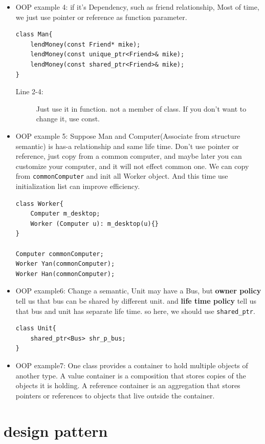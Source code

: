 \documentclass[a4paper,11pt,twoside]{book}
\begin{document}
\begin{itemize}
	\item OOP example 4: if it's Dependency,  such as friend relationship,  Most of time, we just use pointer or reference as function parameter.
\begin{lstlisting}[numbers=none]
class Man{
	lendMoney(const Friend* mike);
    lendMoney(const unique_ptr<Friend>& mike);
    lendMoney(const shared_ptr<Friend>& mike);
}
\end{lstlisting}
\begin{description}
	\item[Line 2-4:] Just use it in function. not a member of class. If you don't want to change it, use const.
\end{description}
	
	\item OOP example 5: Suppose Man and Computer(Associate from structure semantic) is has-a relationship and same life time. Don't use pointer or reference, just copy from a common computer, and maybe later you can customize your computer, and it will not effect common one.  We can copy from \texttt{commonComputer} and init all Worker object.  And this time use initialization list can improve efficiency.
\begin{lstlisting}[numbers=none]
class Worker{
	Computer m_desktop;
	Worker (Computer u): m_desktop(u){}
}
	
Computer commonComputer;
Worker Yan(commonComputer);
Worker Han(commonComputer);
\end{lstlisting}
	
	
	\item OOP example6:  Change a semantic,  Unit may have a Bus, but \textbf{owner policy} tell us that bus can be shared by different unit. and \textbf{life time policy} tell us that bus and unit has separate life time. so here, we should use \texttt{shared\_ptr}.
\begin{lstlisting}[numbers=none]
class Unit{
	shared_ptr<Bus> shr_p_bus;
}
\end{lstlisting}
	
	\item OOP example7: One class provides a container to hold multiple objects of another type. A value container is a composition that stores copies of the objects it is holding. A reference container is an aggregation that stores pointers or references to objects that live outside the container.
	
\end{itemize}


\section{design pattern}
\end{document}
